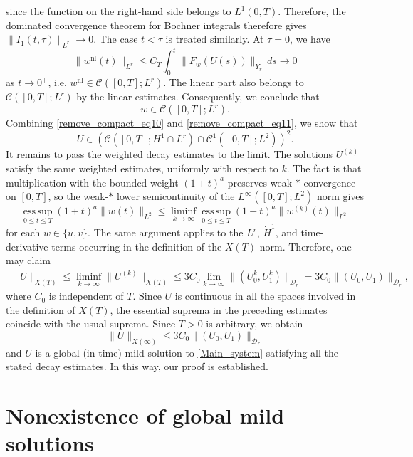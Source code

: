 \documentclass[11pt,reqno]{amsart}
\begin{document}
	since the function on the right-hand side belongs to $L^1(0,T)$. Therefore, the dominated convergence theorem for Bochner integrals therefore gives $\|I_1(t,\tau)\|_{L^r}\to 0$. The case $t<\tau$ is treated similarly. At $\tau=0$, we have
	\[
	\|w^{\mathrm{nl}}(t)\|_{L^r}\leq C_T\int_0^t\|F_w(U(s))\|_{Y_r}\,ds\to 0
	\]
	as $t\to 0^{+}$, i.e. $w^{\mathrm{nl}}
	\in \mathcal{C}([0,T];L^r)$. The linear part also belongs to $\mathcal{C}([0,T];L^r)$ by the linear estimates. Consequently, we conclude that
	\begin{equation}\label{remove_compact_eq11}
		w\in \mathcal{C}([0,T];L^r).
	\end{equation}
	Combining \eqref{remove_compact_eq10} and \eqref{remove_compact_eq11}, we show that
	\[
	U\in\left(\mathcal{C}([0,T];H^1\cap L^r)\cap \mathcal{C}^1([0,T];L^2)\right)^2.
	\]
	It remains to pass the weighted decay estimates to the limit. The solutions $U^{(k)}$ satisfy the same weighted estimates, uniformly with respect to $k$. The fact is that multiplication with the bounded weight $(1+t)^a$ preserves weak-$*$ convergence on $[0,T]$, so the weak-$*$ lower semicontinuity of the $L^\infty([0,T];L^2)$ norm gives
	\[
	\operatorname*{ess\,sup}_{0\leq t\leq T}(1+t)^a\|w(t)\|_{L^2} \leq \liminf_{k\to\infty} \operatorname*{ess\,sup}_{0\leq t\leq T}(1+t)^a\|w^{(k)}(t)\|_{L^2}
	\]
	for each $w\in\{u,v\}$. The same argument applies to the $L^r$, $\dot H^1$, and time-derivative terms occurring in the definition of the $X(T)$ norm. Therefore, one may claim
	\[
	\begin{aligned}
		\|U\|_{X(T)}\leq \liminf_{k\to\infty}\|U^{(k)}\|_{X(T)}\leq 3C_0\lim_{k\to\infty}\|(U_0^k,U_1^k)\|_{\mathcal D_r}=3C_0\|(U_0,U_1)\|_{\mathcal D_r},
	\end{aligned}
	\]
	where $C_0$ is independent of $T$. Since $U$ is continuous in all the spaces involved in the definition of $X(T)$, the essential suprema in the preceding estimates coincide with the usual suprema. Since $T>0$ is arbitrary, we obtain
	\[
	\|U\|_{X(\infty)}\leq 3C_0\|(U_0,U_1)\|_{\mathcal D_r}
	\]
	and $U$ is a global (in time) mild solution to \eqref{Main_system} satisfying all the stated decay estimates. In this way, our proof is established.
	
	
	
	\section{Nonexistence of global mild solutions}\label{sec3}
\end{document}
